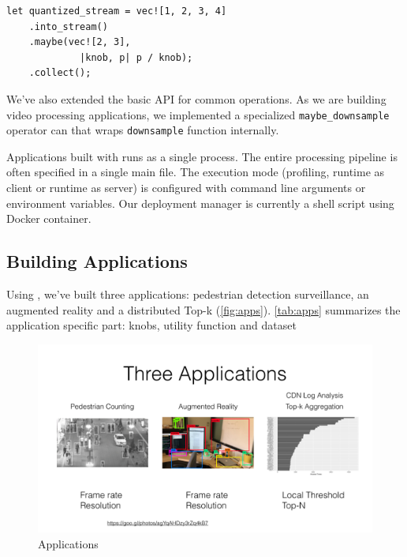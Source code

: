 \begin{lstlisting}
let quantized_stream = vec![1, 2, 3, 4]
    .into_stream()
    .maybe(vec![2, 3],
             |knob, p| p / knob);
    .collect();
\end{lstlisting}

We've also extended the basic API for common operations. As we are building
video processing applications, we implemented a specialized
\texttt{maybe\_downsample} operator can that wraps \texttt{downsample} function
internally.

Applications built with \sysname{} runs as a single process. The entire
processing pipeline is often specified in a single main file. The execution mode
(profiling, runtime as client or runtime as server) is configured with command
line arguments or environment variables. Our deployment manager is currently a
shell script using Docker container.

\subsection{Building \sysname{} Applications}
\label{sec:build-appl}

Using \sysname{}, we've built three applications: pedestrian detection
surveillance, an augmented reality and a distributed Top-k (\autoref{fig:apps}).
\autoref{tab:apps} summarizes the application specific part: knobs, utility
function and dataset

\begin{figure}
  \centering
  \includegraphics[width=\textwidth]{figures/apps.pdf}
  \caption{Applications}
  \label{fig:apps}
\end{figure}


